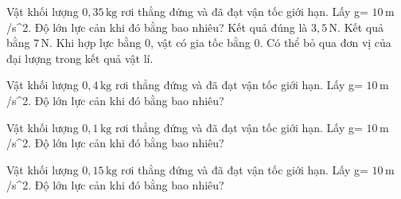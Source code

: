 \begin{ex}
Vật khối lượng $0,35\,\text{kg}$ rơi thẳng đứng và đã đạt vận tốc giới hạn. Lấy g= $10\,\text{m}$ /s^2. Độ lớn lực cản khi đó bằng bao nhiêu?
\choiceTF
{\True Kết quả đúng là $3,5\,\text{N}$.}
{Kết quả bằng $7\,\text{N}$.}
{\True Khi hợp lực bằng 0, vật có gia tốc bằng 0.}
{Có thể bỏ qua đơn vị của đại lượng trong kết quả vật lí.}
\end{ex}

\begin{ex}
Vật khối lượng $0,4\,\text{kg}$ rơi thẳng đứng và đã đạt vận tốc giới hạn. Lấy g= $10\,\text{m}$ /s^2. Độ lớn lực cản khi đó bằng bao nhiêu?
\end{ex}

\begin{ex}
Vật khối lượng $0,1\,\text{kg}$ rơi thẳng đứng và đã đạt vận tốc giới hạn. Lấy g= $10\,\text{m}$ /s^2. Độ lớn lực cản khi đó bằng bao nhiêu?
\end{ex}

\begin{ex}
Vật khối lượng $0,15\,\text{kg}$ rơi thẳng đứng và đã đạt vận tốc giới hạn. Lấy g= $10\,\text{m}$ /s^2. Độ lớn lực cản khi đó bằng bao nhiêu?
\end{ex}

